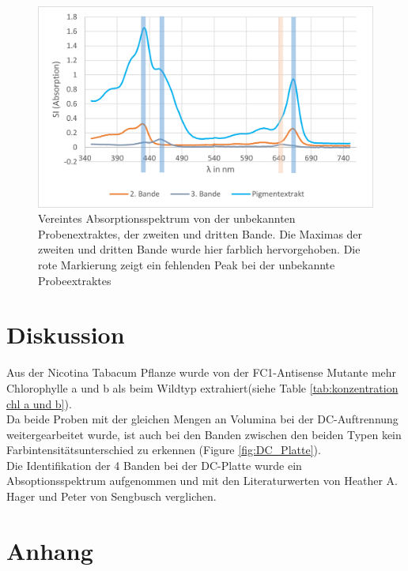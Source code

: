 \documentclass[10pt,a4paper]{article}
\begin{document}
			
			
			\begin{figure}[H]
				\centering
				\includegraphics[scale=0.5]{combinedwithcommonpeaks_Pigmentextrakt.png}
				\caption{Vereintes Absorptionsspektrum von der unbekannten Probenextraktes, der zweiten und dritten Bande. Die Maximas der zweiten und dritten Bande wurde hier farblich hervorgehoben. Die rote Markierung zeigt ein fehlenden Peak bei der unbekannte Probeextraktes}
				\label{fig:kombinierteabsorptionsspektrum}
			\end{figure}
			
			
				
	\section{Diskussion}
	Aus der Nicotina Tabacum Pflanze wurde von der FC1-Antisense Mutante mehr Chlorophylle a und b als beim Wildtyp extrahiert(siehe Table \ref{tab:konzentration chl a und b}).\\
	Da beide Proben mit der gleichen Mengen an Volumina bei der DC-Auftrennung weitergearbeitet wurde, ist auch bei den Banden zwischen den beiden Typen kein Farbintensitätsunterschied zu erkennen (Figure \ref{fig:DC_Platte}).\\

	Die Identifikation der 4 Banden bei der DC-Platte wurde ein Absoptionsspektrum aufgenommen und mit den Literaturwerten von Heather A. Hager \cite{Absorption_Maxima_Carotinoide} und Peter von Sengbusch\cite{Absorption_Maxima_Chlorophylle} verglichen.
	
	
	
	
	\section{Anhang}
\end{document}
